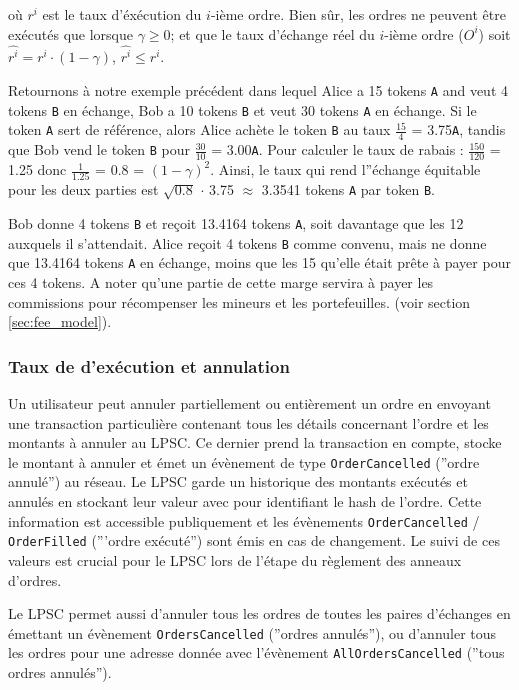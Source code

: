 \documentclass[UTF8,nofonts]{article}
\begin{document}
\begin{multicols}{2}
où $r^i$ est le taux d'éxécution du $i$-ième ordre. Bien sûr, les ordres ne peuvent être exécutés que lorsque $\gamma \ge 0$; et que le taux d'échange réel du $i$-ième ordre ($O^i$) soit $\hat{r^i} = r^i \cdot (1-\gamma)$, $\hat{r^i}\le r^i$.

Retournons à notre exemple précédent dans lequel Alice a 15 tokens \verb|A| and veut 4 tokens \verb|B| en échange, Bob a 10 tokens \verb|B| et veut 30 tokens \verb|A| en échange. Si le token \verb|A| sert de référence, alors Alice achète le token \verb|B| au taux $\frac{15}{4}$ = 3.75\verb|A|, tandis que Bob vend le token \verb|B| pour $\frac{30}{10}$ = 3.00\verb|A|. Pour calculer le taux de rabais : $\frac{150}{120}$ = 1.25 donc $\frac{1}{1.25}$ = 0.8 = $(1 - \gamma)^2$. Ainsi, le taux qui rend l''échange équitable pour les deux parties est $\sqrt{0.8}$ $\cdot$ 3.75 $\approx$ 3.3541 tokens \verb|A| par token \verb|B|.

Bob donne 4 tokens \verb|B| et reçoit 13.4164 tokens \verb|A|, soit davantage que les 12 auxquels il s'attendait. Alice reçoit 4 tokens \verb|B| comme convenu, mais ne donne que 13.4164 tokens \verb|A| en échange, moins que les 15 qu'elle était prête à payer pour ces 4 tokens.
A noter qu'une partie de cette marge servira à payer les commissions pour récompenser les mineurs et les portefeuilles. (voir section \ref{sec:fee_model}).

\subsubsection{Taux de d'exécution et annulation}

Un utilisateur peut annuler partiellement ou entièrement un ordre en envoyant une transaction particulière contenant tous les détails concernant l'ordre et les montants à annuler au LPSC. Ce dernier prend la transaction en compte, stocke le montant à annuler et émet un évènement de type \verb|OrderCancelled| (''ordre annulé'') au réseau. Le LPSC garde un historique des montants exécutés et annulés en stockant leur valeur avec pour identifiant le hash de l'ordre. Cette information est accessible publiquement et les évènements \verb|OrderCancelled| / \verb|OrderFilled| ('''ordre exécuté'') sont émis en cas de changement. Le suivi de ces valeurs est crucial pour le LPSC lors de l'étape du règlement des anneaux d'ordres.

Le LPSC permet aussi d'annuler tous les ordres de toutes les paires d'échanges en émettant un évènement \verb|OrdersCancelled| (''ordres annulés''), ou d'annuler tous les ordres pour une adresse donnée avec l'évènement \verb|AllOrdersCancelled| (''tous ordres annulés'').


\end{multicols}
\end{document}

